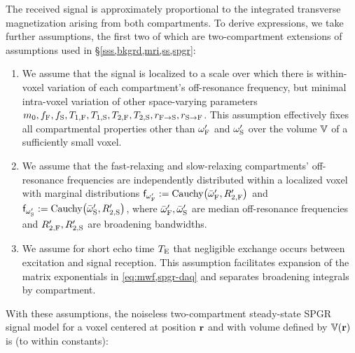 The received signal
is approximately proportional
to the integrated transverse magnetization
arising from both compartments.
To derive expressions,
we take further assumptions,
the first two of which are two-compartment extensions 
of assumptions used 
in \S\ref{sss,bkgrd,mri,ss,spgr}: 
\begin{enumerate}
	\item
		We assume
		that the signal is localized
		to a scale over which 
		there is within-voxel variation
		of each compartment's off-resonance frequency,
		but minimal intra-voxel variation
		of other space-varying parameters
		$m_0, f_{\mathrm{F}}, f_{\mathrm{S}}, T_{1,\mathrm{F}}, T_{1,\mathrm{S}}, T_{2,\mathrm{F}}, T_{2,\mathrm{S}}, r_{\mathrm{F}\to\mathrm{S}}, r_{\mathrm{S}\to\mathrm{F}}$.
		This assumption effectively fixes all compartmental properties 
		other than $\omega'_{\mathrm{F}}$ and $\omega'_{\mathrm{S}}$
		over the volume $\mathbb{V}$ of a sufficiently small voxel.
		\label{item:spgr,int}
		
	\item 
		We assume 
		that the fast-relaxing
		and slow-relaxing compartments' off-resonance frequencies	
		are independently distributed 
		within a localized voxel 
		with marginal distributions
		$\dist{\ompf} := \operatorname{Cauchy}\paren{\ompfmed,\Rtpf}$
		and $\dist{\omps} := \operatorname{Cauchy}\paren{\ompsmed,\Rtps}$,
		where $\bar{\omega}_{\mathrm{F}}',\bar{\omega}_{\mathrm{S}}'$ are median off-resonance frequencies
		and $R_{2,\mathrm{F}}',R_{2,\mathrm{S}}'$ are broadening bandwidths.
		\label{item:spgr,freq}
		
	\item 
		We assume 
		for short echo time $T_\mathrm{E}$
		that negligible exchange occurs
		between excitation and signal reception.
		This assumption facilitates expansion 
		of the matrix exponentials
		in \eqref{eq:mwf,spgr-daq}
		and separates broadening integrals 
		by compartment.
		\label{item:spgr,exchg0}
\end{enumerate}
With these assumptions,
the noiseless two-compartment steady-state SPGR signal model
for a voxel
centered at position $\mathbf{r}$ 
and with volume defined by $\setV\pr$ 
is (to within constants):
